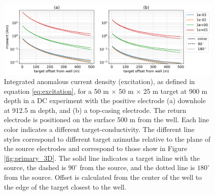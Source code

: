 \begin{figure}
    \begin{center}
    \includegraphics[width=\textwidth]{figures/dc_casing/excitation_3D.png}
    \end{center}
\caption{
    Integrated anomalous current density (excitation), as defined in equation \ref{eq:excitation},
    for a 50 m $\times$ 50 m $\times$ 25 m target at 900 m depth in a DC experiment with the positive electrode
    (a) downhole at 912.5 m depth, and (b) a top-casing electrode. The return electrode is positioned on the
    surface 500 m from the well. Each line color indicates a different target-conductivity. The different line
    styles correspond to different target azimuths relative to the plane of the source electrodes and correspond
    to those show in Figure \ref{fig:primary_3D}. The solid line indicates a target inline with the source,
    the dashed is $90^\circ$ from the source, and the dotted line is $180^{\circ}$ from the source. Offset is
    calculated from the center of the well to the edge of the target closest to the well.
}
\label{fig:excitation_3D}
\end{figure}
